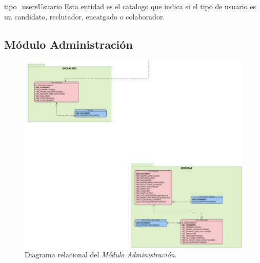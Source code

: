 \begin{cdtEntidad}{tipo_users}{Usuario}{
    Esta entidad es el catalogo que indica si el tipo de usuario es un candidato, reclutador, encatgado o colaborador.
}

\end{cdtEntidad}
\clearpage
\subsection{Módulo Administración}

\begin{figure}[hbtp!]
    \begin{center}
        \includegraphics[width=1 \textwidth]{anexos/imagenes/MDADMN.png}
    \end{center}
    
    \caption{Diagrama relacional del \textit{Módulo Administración}.}
    \label{adcu:grl}
\end{figure}



